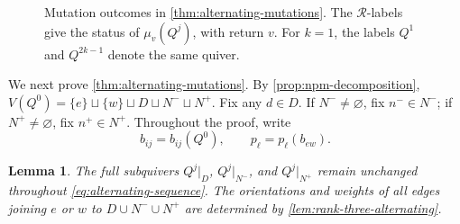 \documentclass[10pt,a4paper]{amsart}
\newtheorem{lemma}[lemma]{Lemma}
\theoremstyle{definition}
\theoremstyle{definition}
\numberwithin{equation}{section}
\numberwithin{table}{section}
\newcommand{\nminus}{N^{-}}
\newcommand{\nplus}{N^{+}}
\newcommand{\Rclass}{\mathcal{R}}
\newcommand{\Qalt}[1]{Q^{#1}}
\begin{document}
\begin{figure}[H]
\caption{Mutation outcomes in \cref{thm:alternating-mutations}.
The $\Rclass$-labels give the status of $\mu_v(Q^j)$, with return $v$.
For $k=1$, the labels $Q^1$ and $Q^{2k-1}$ denote the same quiver.}
\label{fig:alternating-flowchart}
\end{figure}
\endgroup

We next prove \cref{thm:alternating-mutations}. By
\cref{prop:npm-decomposition},
$V(\Qalt{0})=\{e\}\sqcup\{w\}\sqcup D\sqcup\nminus\sqcup\nplus$.
Fix any $d\in D$. If $\nminus\ne\varnothing$, fix $n^-\in\nminus$; if
$\nplus\ne\varnothing$, fix $n^+\in\nplus$. Throughout the proof, write
\[
 b_{ij}=b_{ij}(\Qalt{0}),\qquad p_\ell=p_\ell(b_{ew}).
\]

\begin{lemma}\label{lem:alternating-ew-edges}
The full subquivers $\Qalt{j}|_D$, $\Qalt{j}|_{\nminus}$, and
$\Qalt{j}|_{\nplus}$ remain unchanged throughout
\eqref{eq:alternating-sequence}.
The orientations and weights of all edges joining $e$ or $w$ to
$D\cup\nminus\cup\nplus$ are determined by
\cref{lem:rank-three-alternating}.
\end{lemma}
\end{document}
